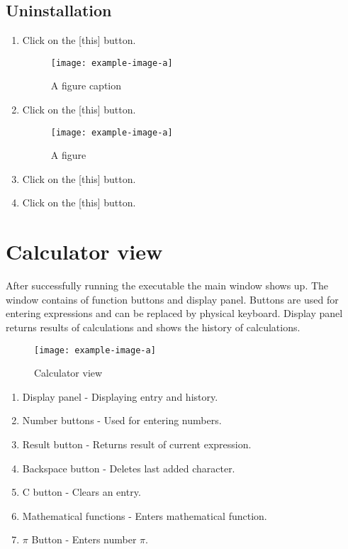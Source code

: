 \documentclass{article}
\begin{document}
\subsection{Uninstallation}

\begin{enumerate}
\item Click on the [this] button.
  \begin{figure}[H]
    \centering
    \texttt{[image: example-image-a]}
    \caption{A figure caption}
  \end{figure}
  
\item Click on the [this] button.
  \begin{figure}[H]
    \centering
    \texttt{[image: example-image-a]}
    \caption{A figure }
  \end{figure}

\item Click on the [this] button.
\item Click on the [this] button.
\end{enumerate}


\section{Calculator view}
After successfully running the executable the main window shows up. The window contains of function buttons and display panel. Buttons are used for entering expressions and can be replaced by physical keyboard. Display panel returns results of calculations and shows the history of calculations.
  \begin{figure}[H]
    \centering
    \texttt{[image: example-image-a]}
  \caption{Calculator view}
\end{figure}

\begin{enumerate}
\item Display panel - Displaying entry and history.
\item Number buttons - Used for entering numbers.
\item Result button - Returns result of current expression.
\item Backspace button - Deletes last added character.
\item C button - Clears an entry.
\item Mathematical functions - Enters mathematical function.
\item $\pi$ Button - Enters number $\pi$.
\end{enumerate}
\end{document}
